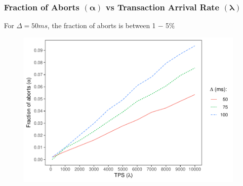 \begin{frame}
  \frametitle{Fraction of Aborts $(\boldsymbol{\alpha})$ vs Transaction Arrival Rate $(\boldsymbol{\lambda})$}
  \begin{center}
    For $\Delta = 50 ms$, the fraction of aborts is between 1 − 5\%
  \end{center}
    \begin{figure}[h!]
    \centering
    \includegraphics[scale=0.5]{./figures/aborts}
  \end{figure}
\end{frame}